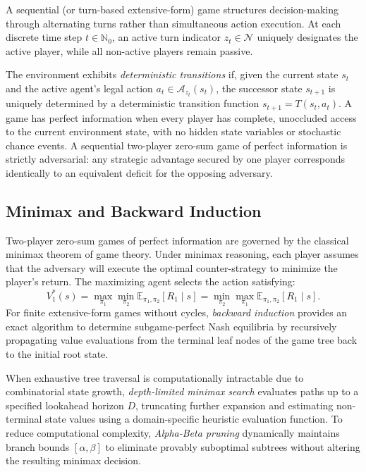 \documentclass{article}
\begin{document}
A sequential (or turn-based extensive-form) game structures decision-making through alternating turns rather than simultaneous action execution. At each discrete time step $t \in \mathbb{N}_0$, an active turn indicator $z_t \in \mathcal{N}$ uniquely designates the active player, while all non-active players remain passive. 

The environment exhibits \emph{deterministic transitions} if, given the current state $s_t$ and the active agent's legal action $a_t \in \mathcal{A}_{z_t}(s_t)$, the successor state $s_{t+1}$ is uniquely determined by a deterministic transition function $s_{t+1} = T(s_t, a_t)$. A game has perfect information when every player has complete, unoccluded access to the current environment state, with no hidden state variables or stochastic chance events. A sequential two-player zero-sum game of perfect information is strictly adversarial: any strategic advantage secured by one player corresponds identically to an equivalent deficit for the opposing adversary.

\subsection{Minimax and Backward Induction}
\label{subsec:prelim_minimax}

Two-player zero-sum games of perfect information are governed by the classical minimax theorem of game theory. Under minimax reasoning, each player assumes that the adversary will execute the optimal counter-strategy to minimize the player's return. The maximizing agent selects the action satisfying:
\begin{equation}
V_1^*(s) = \max_{\pi_1} \min_{\pi_2} \mathbb{E}_{\pi_1, \pi_2}[R_1 \mid s] = \min_{\pi_2} \max_{\pi_1} \mathbb{E}_{\pi_1, \pi_2}[R_1 \mid s].
\end{equation}
For finite extensive-form games without cycles, \emph{backward induction} provides an exact algorithm to determine subgame-perfect Nash equilibria by recursively propagating value evaluations from the terminal leaf nodes of the game tree back to the initial root state. 

When exhaustive tree traversal is computationally intractable due to combinatorial state growth, \emph{depth-limited minimax search} evaluates paths up to a specified lookahead horizon $D$, truncating further expansion and estimating non-terminal state values using a domain-specific heuristic evaluation function. To reduce computational complexity, \emph{Alpha-Beta pruning} dynamically maintains branch bounds $[\alpha, \beta]$ to eliminate provably suboptimal subtrees without altering the resulting minimax decision.
\end{document}
